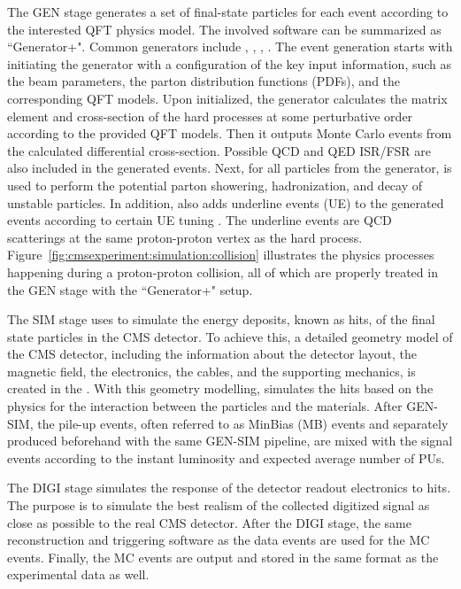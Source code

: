 The GEN stage generates a set of final-state particles for each event according to the interested QFT physics model. The involved software can be summarized as ``Generator+\PYTHIA". Common generators include \MADGRAPH, \POWHEG, \HERWIG, \SHERPA. The event generation starts with initiating the generator with a configuration of the key input information, such as the beam parameters, the parton distribution functions (PDFs), and the corresponding QFT models.  Upon initialized, the generator calculates the matrix element and cross-section of the hard processes at some perturbative order according to the provided QFT models. Then it outputs Monte Carlo events from the calculated differential cross-section. Possible QCD and QED ISR/FSR are also included in the generated events. Next, for all particles from the generator, \PYTHIA is used to perform the potential parton showering, hadronization, and decay of unstable particles. In addition, \PYTHIA also adds underline events (UE) to the generated events according to certain UE tuning \cite{Sirunyan:2019dfx}. The underline events are QCD scatterings at the same proton-proton vertex as the hard process. Figure~\ref{fig:cmsexperiment:simulation:collision} illustrates the physics processes happening during a proton-proton collision, all of which are properly treated in the GEN stage with the ``Generator+\PYTHIA" setup.




The SIM stage uses \GEANTfour to simulate the energy deposits, known as hits, of the final state particles in the CMS detector. To achieve this, a detailed geometry model of the CMS detector, including the information about the detector layout, the magnetic field, the electronics, the cables, and the supporting mechanics, is created in the \GEANTfour. With this geometry modelling, \GEANTfour simulates the hits based on the physics for the interaction between the particles and the materials. After GEN-SIM, the pile-up events, often referred to as MinBias (MB) events and separately produced beforehand with the same GEN-SIM pipeline, are mixed with the signal events according to the instant luminosity and expected average number of PUs.

The DIGI stage simulates the response of the detector readout electronics to hits. The purpose is to simulate the best realism of the collected digitized signal as close as possible to the real CMS detector. After the DIGI stage, the same reconstruction and triggering software as the data events are used for the MC events. Finally, the MC events are output and stored in the same format as the experimental data as well.